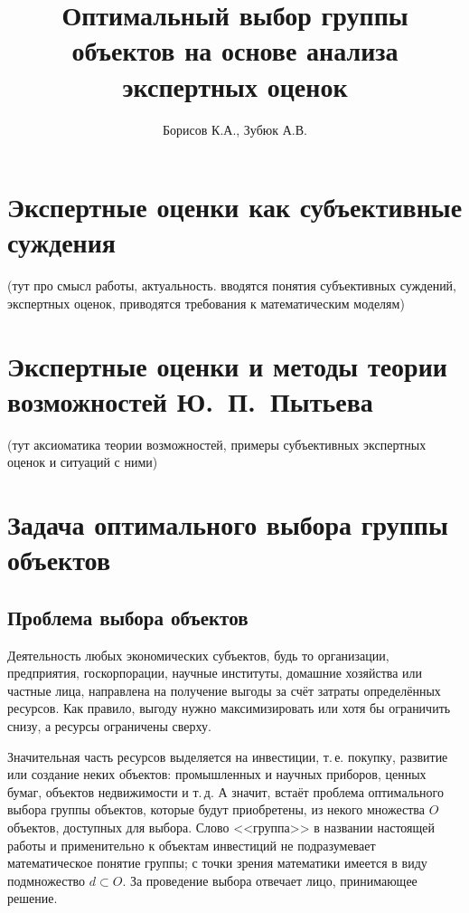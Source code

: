 \documentclass{article}
\begin{document}

\thispagestyle{empty}			

\title{Оптимальный выбор группы объектов на основе анализа экспертных оценок} 
\author{Борисов К.А., Зубюк А.В.}
\maketitle

\tableofcontents
\newpage

\section{Экспертные оценки как субъективные суждения} 
(тут про смысл работы, актуальность. вводятся понятия субъективных суждений, экспертных оценок, приводятся требования к математическим моделям)
% 

\section{Экспертные оценки и методы теории возможностей Ю.~П.~Пытьева}
(тут аксиоматика теории возможностей, примеры субъективных экспертных оценок и ситуаций с ними)

\section{Задача оптимального выбора группы объектов}

\subsection{Проблема выбора объектов}

Деятельность любых экономических субъектов, будь то организации, предприятия, госкорпорации, научные институты, домашние хозяйства или частные лица, направлена на получение выгоды за счёт затраты определённых ресурсов. Как правило, выгоду нужно максимизировать или хотя бы ограничить снизу, а ресурсы ограничены сверху. 

Значительная часть ресурсов выделяется на инвестиции, т.\,е. покупку, развитие или создание неких объектов: промышленных и научных приборов, ценных бумаг, объектов недвижимости и т.\,д. А значит, встаёт проблема оптимального выбора группы объектов, которые будут приобретены, из некого множества $O$ объектов, доступных для выбора. Слово <<группа>> в названии настоящей работы и применительно к объектам инвестиций не подразумевает  математическое понятие группы; с точки зрения математики имеется в виду подмножество $d \subset O$. За проведение выбора отвечает лицо, принимающее решение.
\end{document}
